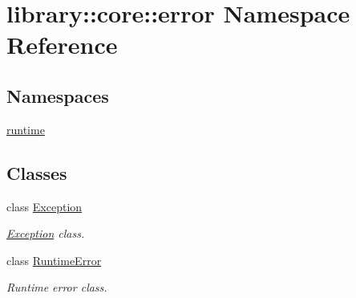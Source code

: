 \hypertarget{namespacelibrary_1_1core_1_1error}{}\section{library\+:\+:core\+:\+:error Namespace Reference}
\label{namespacelibrary_1_1core_1_1error}
\subsection*{Namespaces}
\begin{DoxyCompactItemize}
\item 
 \hyperlink{namespacelibrary_1_1core_1_1error_1_1runtime}{runtime}
\end{DoxyCompactItemize}
\subsection*{Classes}
\begin{DoxyCompactItemize}
\item 
class \hyperlink{classlibrary_1_1core_1_1error_1_1_exception}{Exception}
\begin{DoxyCompactList}\small\item\em \hyperlink{classlibrary_1_1core_1_1error_1_1_exception}{Exception} class. \end{DoxyCompactList}\item 
class \hyperlink{classlibrary_1_1core_1_1error_1_1_runtime_error}{Runtime\+Error}
\begin{DoxyCompactList}\small\item\em Runtime error class. \end{DoxyCompactList}\end{DoxyCompactItemize}

